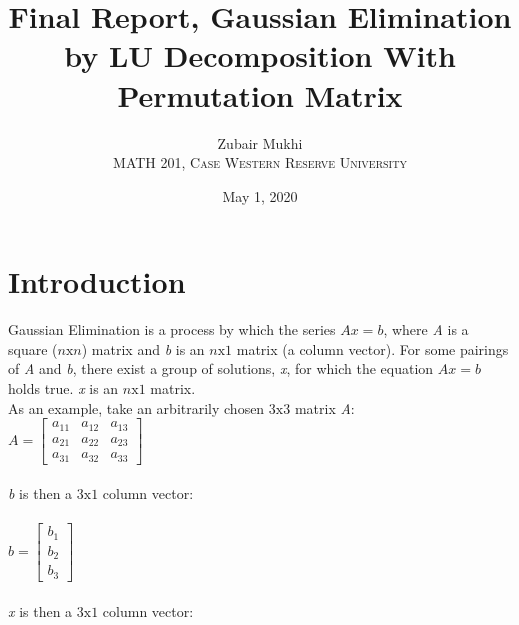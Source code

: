 \documentclass{article}
\title{Final Report, Gaussian Elimination by LU Decomposition With Permutation Matrix}
\author{Zubair Mukhi\\
MATH 201, \textsc{Case Western Reserve University}
}
\date{May 1, 2020}
\begin{document}
\maketitle
\tableofcontents
\pagebreak

\section{Introduction}
Gaussian Elimination is a process by which the series \begin{math}Ax=b\end{math}, where \emph{A} is a square (\begin{math}n\text{x}n\end{math}) matrix and \emph{b} is an \begin{math}n\text{x}1\end{math} matrix (a column vector). For some pairings of \emph{A} and \emph{b}, there exist a group of solutions, \emph{x}, for which the equation \begin{math}Ax=b\end{math} holds true. \emph{x} is an \begin{math}n\text{x}1\end{math} matrix.\\
As an example, take an arbitrarily chosen \begin{math}3\text{x}3\end{math} matrix \emph{A}:\\
\begin{math}A = \begin{bmatrix}a_{11}&a_{12}&a_{13}\\a_{21}&a_{22}&a_{23}\\a_{31}&a_{32}&a_{33}\end{bmatrix}\end{math}\\\\
\emph{b} is then a \begin{math}3\text{x}1\end{math} column vector:\\\\
\begin{math}b=\begin{bmatrix}b_{1}\\b_{2}\\b_{3}\end{bmatrix}\end{math}\\\\
\emph{x} is then a \begin{math}3\text{x}1\end{math} column vector: \\\\
\end{document}
